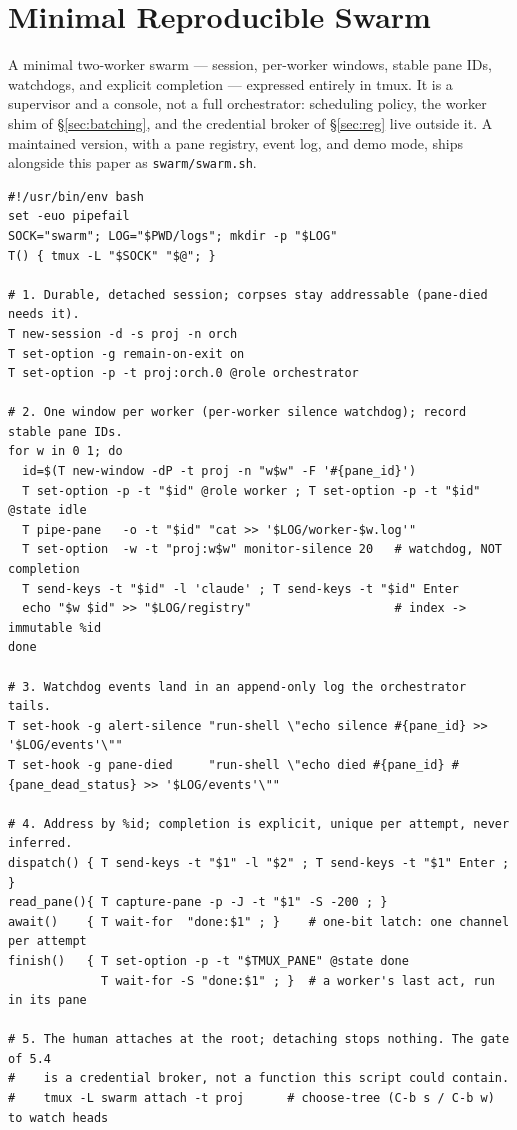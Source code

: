 \documentclass[10pt]{article}
\newcommand{\code}[1]{\texttt{\small #1}}
\begin{document}
\appendix
\section{Minimal Reproducible Swarm}

A minimal two-worker swarm --- session, per-worker windows, stable pane IDs,
watchdogs, and explicit completion --- expressed entirely in tmux. It is a
supervisor and a console, not a full orchestrator: scheduling policy, the worker
shim of \S\ref{sec:batching}, and the credential broker of \S\ref{sec:reg} live
outside it. A maintained version, with a pane registry, event log, and demo mode,
ships alongside this paper as \code{swarm/swarm.sh}.

\begin{lstlisting}
#!/usr/bin/env bash
set -euo pipefail
SOCK="swarm"; LOG="$PWD/logs"; mkdir -p "$LOG"
T() { tmux -L "$SOCK" "$@"; }

# 1. Durable, detached session; corpses stay addressable (pane-died needs it).
T new-session -d -s proj -n orch
T set-option -g remain-on-exit on
T set-option -p -t proj:orch.0 @role orchestrator

# 2. One window per worker (per-worker silence watchdog); record stable pane IDs.
for w in 0 1; do
  id=$(T new-window -dP -t proj -n "w$w" -F '#{pane_id}')
  T set-option -p -t "$id" @role worker ; T set-option -p -t "$id" @state idle
  T pipe-pane   -o -t "$id" "cat >> '$LOG/worker-$w.log'"
  T set-option  -w -t "proj:w$w" monitor-silence 20   # watchdog, NOT completion
  T send-keys -t "$id" -l 'claude' ; T send-keys -t "$id" Enter
  echo "$w $id" >> "$LOG/registry"                    # index -> immutable %id
done

# 3. Watchdog events land in an append-only log the orchestrator tails.
T set-hook -g alert-silence "run-shell \"echo silence #{pane_id} >> '$LOG/events'\""
T set-hook -g pane-died     "run-shell \"echo died #{pane_id} #{pane_dead_status} >> '$LOG/events'\""

# 4. Address by %id; completion is explicit, unique per attempt, never inferred.
dispatch() { T send-keys -t "$1" -l "$2" ; T send-keys -t "$1" Enter ; }
read_pane(){ T capture-pane -p -J -t "$1" -S -200 ; }
await()    { T wait-for  "done:$1" ; }    # one-bit latch: one channel per attempt
finish()   { T set-option -p -t "$TMUX_PANE" @state done
             T wait-for -S "done:$1" ; }  # a worker's last act, run in its pane

# 5. The human attaches at the root; detaching stops nothing. The gate of 5.4
#    is a credential broker, not a function this script could contain.
#    tmux -L swarm attach -t proj      # choose-tree (C-b s / C-b w) to watch heads
\end{lstlisting}
\end{document}
